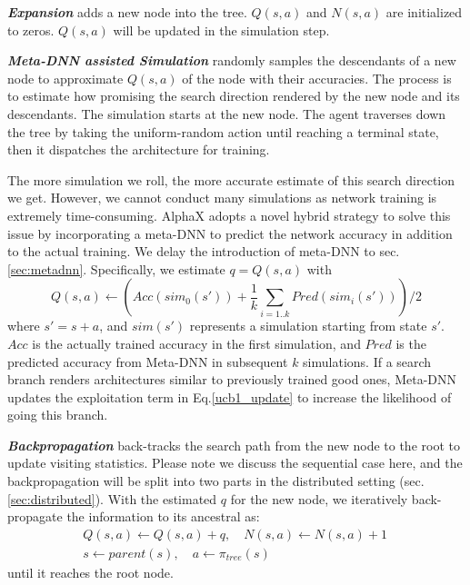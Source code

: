 \documentclass[10pt,twocolumn,letterpaper]{article}
\begin{document}
\textbf{\textit{Expansion}} adds a new node into the tree. $Q(s, a)$ and $N(s, a)$ are initialized to zeros. $Q(s, a)$ will be updated in the simulation step.


\textbf{\textit{Meta-DNN assisted Simulation}} randomly samples the descendants of a new node to approximate $Q(s, a)$ of the node with their accuracies.
The process is to estimate how promising the search direction rendered by the new node and its descendants. The simulation starts at the new node. The agent traverses down the tree by taking the uniform-random action until reaching a terminal state, then it dispatches the architecture for training.

The more simulation we roll, the more accurate estimate of this search direction we get. However, we cannot conduct many simulations as network training is extremely time-consuming.
AlphaX adopts a novel hybrid strategy to solve this issue by incorporating a meta-DNN to predict the network accuracy in addition to the actual training. We delay the introduction of meta-DNN to sec.\ref{sec:metadnn}.
Specifically, we estimate $q = Q(s, a)$ with
\begin{equation}
	\label{reward}
Q(s, a) \leftarrow \left( Acc(sim_0(s')) + \frac{1}{k} \sum_{i=1..k} Pred(sim_i(s')) \right) / 2
\end{equation}
where $s' = s + a$, and $sim(s')$ represents a simulation starting from state $s'$. $Acc$ is the actually trained accuracy in the first simulation, and $Pred$ is the predicted accuracy from Meta-DNN in subsequent $k$ simulations. If a search branch renders architectures similar to previously trained good ones, Meta-DNN updates the exploitation term in Eq.\ref{ucb1_update} to increase the likelihood of going this branch.



\textbf{\textit{Backpropagation}} back-tracks the search path from the new node to the root to update visiting statistics. Please note we discuss the sequential case here, and the backpropagation will be split into two parts in the distributed setting (sec.\ref{sec:distributed}). 
With the estimated $q$ for the new node, we iteratively back-propagate the information to its ancestral as:
\begin{equation}
	\begin{split}
	& Q(s, a) \leftarrow Q(s, a) + q, \quad
	 N(s, a) \leftarrow N(s, a) + 1 \quad \\
	& s \leftarrow parent(s), \quad
	 a \leftarrow \pi_{tree}(s)
	\end{split}
\end{equation}
until it reaches the root node.
\end{document}
